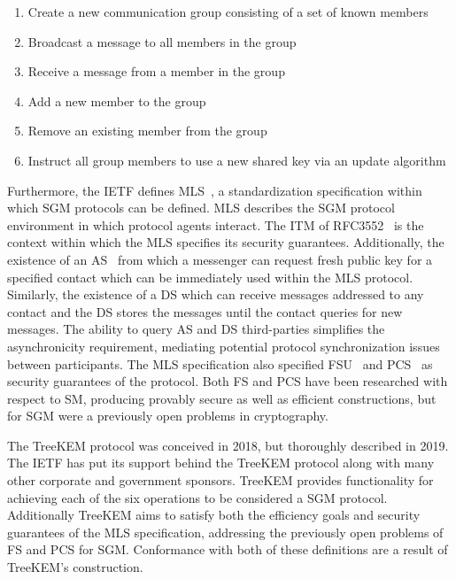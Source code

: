 \documentclass[runningheads]{llncs}
\newcommand{\Abrev}[1]{\gls{#1}}
\begin{document}
\begin{enumerate}
\item Create a new communication group consisting of a set of known members
\item Broadcast a message to all members in the group
\item Receive a message from a member in the group
\item Add a new member to the group
\item Remove an existing member from the group
\item Instruct all group members to use a new shared key via an update algorithm
\end{enumerate}

Furthermore, the \Abrev{IETF} defines \Abrev{MLS}~\cite{Omara2020}, a standardization specification within which \Abrev{SGM} protocols can be defined.
\Abrev{MLS} describes the \Abrev{SGM} protocol environment in which protocol agents interact.
The \Abrev{ITM} of RFC3552~\cite{rescorla2003rfc3552} is the context within which the \Abrev{MLS} specifies its security guarantees.
Additionally, the existence of an \Abrev{AS}~\cite{perlman1999overview} from which a messenger can request fresh public key for a specified contact which can be immediately used within the \Abrev{MLS} protocol.
Similarly, the existence of a \Abrev{DS} which can receive messages addressed to any contact and the \Abrev{DS} stores the messages until the contact queries for new messages.
The ability to query \Abrev{AS} and \Abrev{DS} third-parties simplifies the asynchronicity requirement, mediating potential protocol synchronization issues between participants.
The \Abrev{MLS} specification also specified \Abrev{FSU}~\cite{Omara2020} and \Abrev{PCS}~\cite{cohn2016post} as security guarantees of the protocol.
Both \Abrev{FS} and \Abrev{PCS} have been researched with respect to \Abrev{SM}, producing provably secure as well as efficient constructions, but for \Abrev{SGM} were a previously open problems in cryptography.

The TreeKEM protocol \cite{bhargavan:hal-02425247} was conceived in 2018, but thoroughly described in 2019.
The \Abrev{IETF} has put its support behind the TreeKEM protocol along with many other corporate and government sponsors.
TreeKEM provides functionality for achieving each of the six operations to be considered a \Abrev{SGM} protocol.
Additionally TreeKEM aims to satisfy both the efficiency goals and security guarantees of the \Abrev{MLS} specification, addressing the previously open problems of \Abrev{FS} and \Abrev{PCS} for \Abrev{SGM}.
Conformance with both of these definitions are a result of TreeKEM's construction.
\end{document}
